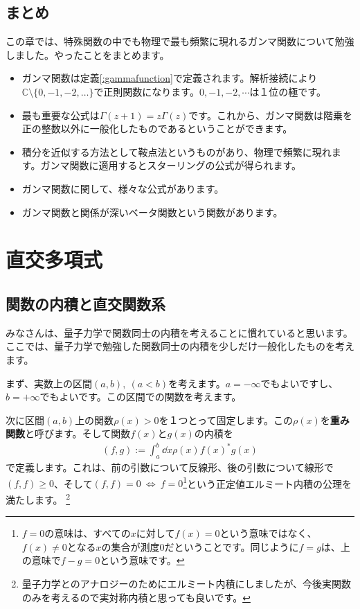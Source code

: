 \documentclass[report,paper=a4, fontsize=12pt, line_length=16cm, number_of_lines=33,dvipdfmx]{jlreq}
\numberwithin{equation}{section}
\newcommand{\Cb}{\mathbb{C}}
\newcommand{\strong}[1]{\textsf{\bfseries #1}}
\begin{document}
\section{まとめ}
この章では、特殊関数の中でも物理で最も頻繁に現れるガンマ関数について勉強しました。やったことをまとめます。
\begin{itemize}
  \item ガンマ関数は定義\ref{:gammafunction}で定義されます。解析接続により$\Cb\setminus \{0,-1,-2,\dots\}$で正則関数になります。$0,-1,-2,\cdots$は１位の極です。
  \item 最も重要な公式は$\Gamma(z+1)=z\Gamma(z)$です。これから、ガンマ関数は階乗を正の整数以外に一般化したものであるということができます。
  \item 積分を近似する方法として鞍点法というものがあり、物理で頻繁に現れます。ガンマ関数に適用するとスターリングの公式が得られます。
  \item ガンマ関数に関して、様々な公式があります。
  \item ガンマ関数と関係が深いベータ関数という関数があります。
\end{itemize}


\chapter{直交多項式}

\section{関数の内積と直交関数系}
みなさんは、量子力学で関数同士の内積を考えることに慣れていると思います。ここでは、量子力学で勉強した関数同士の内積を少しだけ一般化したものを考えます。

まず、実数上の区間$(a,b),\ (a<b)$を考えます。$a=-\infty$でもよいですし、$b=+\infty$でもよいです。この区間での関数を考えます。

次に区間$(a,b)$上の関数$\rho(x)> 0$を１つとって固定します。この$\rho(x)$を\strong{重み関数}と呼びます。そして関数$f(x)$と$g(x)$の内積を
\begin{align}
  (f,g):=\int_{a}^{b} \dd{x} \rho(x) f(x)^{*} g(x) \label{innerproduct}
\end{align}
で定義します。これは、前の引数について反線形、後の引数について線形で$(f,f)\ge 0$、そして$(f,f)=0\ \Leftrightarrow \ f=0$\footnote{$f=0$の意味は、すべての$x$に対して$f(x)=0$という意味ではなく、$f(x)\ne 0$となる$x$の集合が測度$0$だということです。同じように$f=g$は、上の意味で$f-g=0$という意味です。}という正定値エルミート内積の公理を満たします。 \footnote{量子力学とのアナロジーのためにエルミート内積にしましたが、今後実関数のみを考えるので実対称内積と思っても良いです。}
\end{document}
